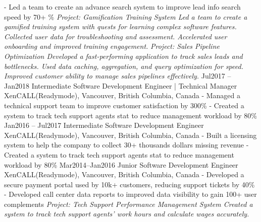 \documentclass[9pt]{developercv} %
\begin{document}
\begin{entrylist}
{            - Led a team to create an advance search system to improve lead info search speed by 70+ \%\newline
            \textit{Project: Gamification Training System\newline
            Led a team to create a gamified training system with quests for learning complex software features. 
            Collected user data for troubleshooting and assessment. 
            Accelerated user onboarding and improved training engagement. \newline\newline}
            \textit{Project: Sales Pipeline Optimization\newline
            Developed a fast-performing application to track sales leads and bottlenecks. 
            Used data caching, aggregation, and query optimization for speed. 
            Improved customer ability to manage sales pipelines effectively.\newline}
        }
	\entry
		{Jul2017 -- Jan2018}
		{Intermediate Software Development Engineer | Technical Manager}
		{XenCALL(Readymode), Vancouver, British Columbia, Canada}
		{
            - Managed a technical support team to improve customer satisfaction by 300\%\newline
            - Created a system to track tech support agents stat to reduce management workload by 80\%\newline
        }
	\entry
		{Jan2016 -- Jul2017}
		{Intermediate Software Development Engineer}
		{XenCALL(Readymode), Vancouver, British Columbia, Canada}
		{
            - Built a licensing system to help the company to collect 30+ thousands dollars missing revenue\newline
            - Created a system to track tech support agents stat to reduce management workload by 80\%\newline
        }
	\entry
		{Mar2014--Jan2016}
		{Junior Software Development Engineer}
		{XenCALL(Readymode), Vancouver, British Columbia, Canada}
		{
            - Developed a secure payment portal used by 10k+ customers, reducing support tickets by 40\%\newline
            - Developed call center data reports to improved data visibility to gain 100+ user complements\newline
            \newline
            \textit{Project: Tech Support Performance Management System\newline
            Created a system to track tech support agents' work hours and calculate wages accurately. 
}}
\end{entrylist}
\end{document}
